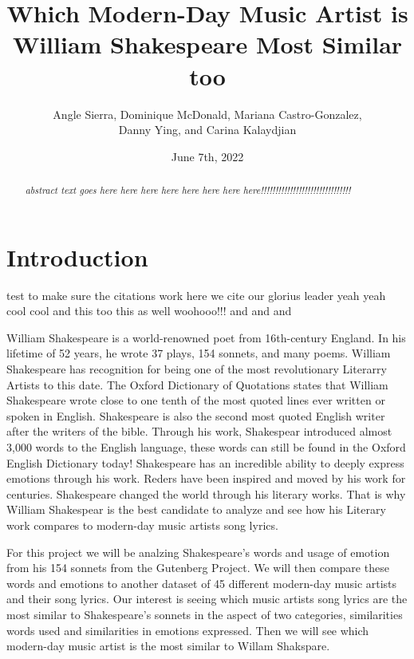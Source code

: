 \documentclass[11pt]{article}
\title {Which Modern-Day Music Artist is William Shakespeare Most Similar too\\[1ex]}
\author{
Angle Sierra, 
Dominique McDonald,
Mariana Castro-Gonzalez, \\
Danny Ying,
and Carina Kalaydjian \\[1ex]
}
\date{June 7th, 2022}
\newcommand{\abstractinenglishname}{Abstract}
\newenvironment{abstractinenglish}{
        \def\abstractname{\abstractinenglishname}
	\begin{abstract}
}{
        \end{abstract}
}
\begin{document}
\maketitle
\vspace{6pt}

\begin{abstractinenglish}
\emph{abstract text goes here here here here here here here here!!!!!!!!!!!!!!!!!!!!!!!!!!!!!!!}
\end{abstractinenglish}

\section{Introduction}
test to make sure the citations work 
here we cite \cite{web1} our glorius leader \cite{web2} yeah yeah cool cool \cite{briney2015data} and this too \cite{monkey} this as well \cite{sonnetsData} woohooo!!! \cite{musicData} and \cite{syuzhet} and \cite{tm} and \cite{shakeFacts}

William Shakespeare is a world-renowned poet from 16th-century England. In his lifetime of 52 years, he wrote 37 plays, 154 sonnets, and many poems\cite{shakeFacts}. William Shakespeare has recognition for being one of the most revolutionary Literarry Artists to this date\cite{shakeFacts}. The Oxford Dictionary of Quotations states that William Shakespeare wrote close to one tenth of the most quoted lines ever written or spoken in English\cite{shakeFacts}. Shakespeare is also the second most quoted English writer after the writers of the bible\cite{shakeFacts}. Through his work, Shakespear introduced almost  3,000 words to the English language, these words can still be found in the Oxford English Dictionary today\cite{shakeFacts}! Shakespeare has an incredible ability to deeply express emotions through his work. Reders have been inspired and moved by his work for centuries. Shakespeare changed the world through his literary works. That is why William Shakespear is the best candidate to analyze and see how his Literary work compares to modern-day music artists song lyrics. 

For this project we will be analzing Shakespeare's words and usage of emotion from his 154 sonnets from the Gutenberg Project\cite{sonnetsData}. We will then compare these words and emotions to another dataset of 45 different modern-day music artists and their song lyrics\cite{musicData}. Our interest is seeing which music artists song lyrics are the most similar to Shakespeare's sonnets in the aspect of two categories, similarities words used and similarities in emotions expressed. Then we will see which modern-day music artist is the most similar to Willam Shakspare.  
\end{document}
